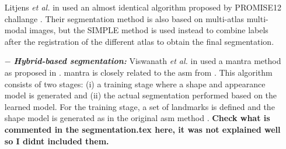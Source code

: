 \begin{enumerate}[leftmargin=*]
Litjens \textit{et al.} in \cite{Litjens2014} used an almost identical algorithm proposed by PROMISE12 challange \cite{Litjens2014a}.
Their segmentation method is also based on multi-atlas multi-modal images, but the SIMPLE method \cite{langerak2010label} is used instead to combine labels after the registration of the different atlas to obtain the final segmentation.
 
\item[$-$] \textbf{\textit{Hybrid-based segmentation:}} Viswanath \textit{et al.} in \cite{Viswanath2008a,Viswanath2009} used a \ac{mantra} method as proposed in \cite{Toth2008}.
\ac{mantra} is closely related to the \ac{asm} from \cite{Cootes1995}.
This algorithm consists of two stages: (i) a training stage where a shape and appearance model is generated and (ii) the actual segmentation performed based on the learned model. 
For the training stage, a set of landmarks is defined and the shape model is generated as in the original \ac{asm} method \cite{Cootes1995}.
{\color{red}\textbf{Check what is commented in the segmentation.tex here, it was not explained well so I didnt included them.}}





\end{enumerate}
